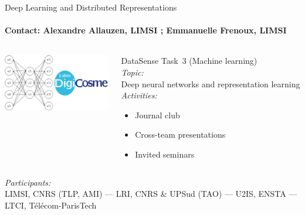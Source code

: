 \begin{frame}{Deep Learning and Distributed Representations}
\framesubtitle{Contact: Alexandre Allauzen, LIMSI ; Emmanuelle Frenoux, LIMSI }

  \begin{columns}
    \begin{column}{3cm}
      \includegraphics[width=\linewidth]{Images/deepnet1.png}
    \end{column}
    \begin{column}{8cm}
      DataSense Task~3 (Machine learning)\\[2ex]

      \emph{Topic:}\\
      Deep neural networks and representation learning\\[2ex]

      \emph{Activities:}
      \begin{itemize}
      \item Journal club
      \item Cross-team presentations
      \item Invited seminars
      \end{itemize}
    \end{column}

  \end{columns}
  \vfill

  \emph{Participants:}\\
    LIMSI, CNRS (TLP, AMI) ---
    LRI, CNRS \& UPSud (TAO) ---
    U2IS, ENSTA ---
    LTCI, Télécom-ParisTech


\end{frame}

